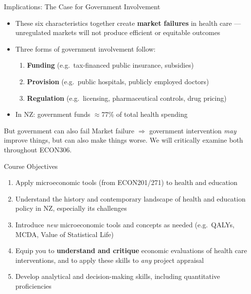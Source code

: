 \documentclass[aspectratio=169, 12pt]{beamer}
\begin{document}
\begin{frame}{Implications: The Case for Government Involvement}
  \begin{itemize}
    \item These six characteristics together create \textbf{market failures} in health care ---
          unregulated markets will not produce efficient or equitable outcomes
    \item Three forms of government involvement follow:
    \begin{enumerate}
      \item \textbf{Funding} (e.g.\ tax-financed public insurance, subsidies)
      \item \textbf{Provision} (e.g.\ public hospitals, publicly employed doctors)
      \item \textbf{Regulation} (e.g.\ licensing, pharmaceutical controls, drug pricing)
    \end{enumerate}
    \item In NZ: government funds $\approx$77\% of total health spending
  \end{itemize}
  \vspace{0.3em}
  \begin{alertblock}{But government can also fail}
    Market failure $\Rightarrow$ government intervention \emph{may} improve things, but can also
    make things worse. We will critically examine both throughout ECON306.
  \end{alertblock}
\end{frame}

\begin{frame}{Course Objectives}
  \begin{enumerate}
    \item Apply microeconomic tools (from ECON201/271) to health and education
    \item Understand the history and contemporary landscape of health and education policy
          in NZ, especially its challenges
    \item Introduce \emph{new} microeconomic tools and concepts as needed (e.g.\ QALYs, MCDA,
          Value of Statistical Life)
    \item Equip you to \textbf{understand and critique} economic evaluations of health care
          interventions, and to apply these skills to \emph{any} project appraisal
    \item Develop analytical and decision-making skills, including quantitative proficiencies
  \end{enumerate}
\end{frame}
\end{document}
